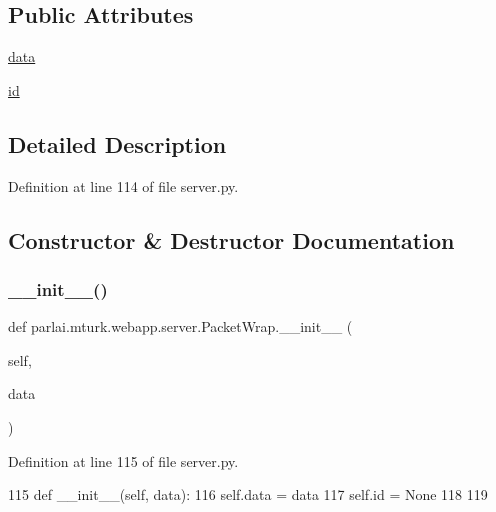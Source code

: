 \subsection*{Public Attributes}
\begin{DoxyCompactItemize}
\item 
\hyperlink{classparlai_1_1mturk_1_1webapp_1_1server_1_1PacketWrap_af3f249f0c13cb902b511ed12adb5f30c}{data}
\item 
\hyperlink{classparlai_1_1mturk_1_1webapp_1_1server_1_1PacketWrap_a588c6f6a5e15b3eb32e497483d22e7e3}{id}
\end{DoxyCompactItemize}


\subsection{Detailed Description}


Definition at line 114 of file server.\+py.



\subsection{Constructor \& Destructor Documentation}
\mbox{\label{classparlai_1_1mturk_1_1webapp_1_1server_1_1PacketWrap_af77cc3a7250c4efafafbf382753b834d}} 
\subsubsection{\texorpdfstring{\+\_\+\+\_\+init\+\_\+\+\_\+()}{\_\_init\_\_()}}
{\footnotesize\ttfamily def parlai.\+mturk.\+webapp.\+server.\+Packet\+Wrap.\+\_\+\+\_\+init\+\_\+\+\_\+ (\begin{DoxyParamCaption}\item[{}]{self,  }\item[{}]{data }\end{DoxyParamCaption})}



Definition at line 115 of file server.\+py.


\begin{DoxyCode}
115     \textcolor{keyword}{def }\_\_init\_\_(self, data):
116         self.data = data
117         self.id = \textcolor{keywordtype}{None}
118 
119 
\end{DoxyCode}


